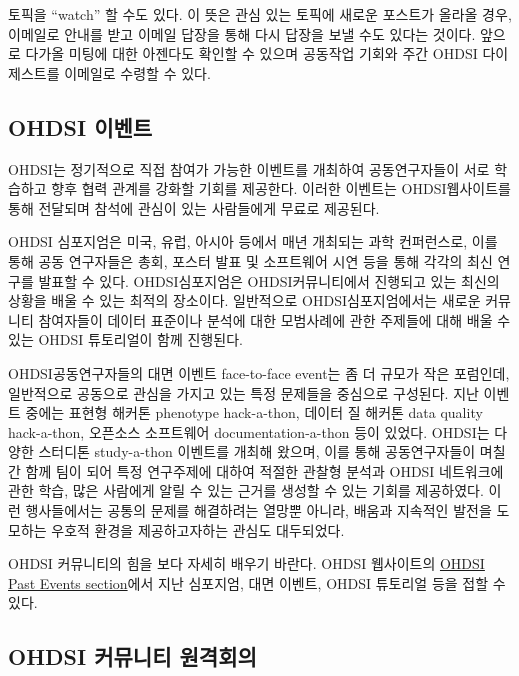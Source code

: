 \documentclass[11pt]{book}
\theoremstyle{definition}
\theoremstyle{definition}
\theoremstyle{definition}
\theoremstyle{remark}
\let\BeginKnitrBlock\begin \let\EndKnitrBlock\end
\begin{document}
\BeginKnitrBlock{rmdimportant}
토픽을 ``watch'' 할 수도 있다. 이 뜻은 관심 있는 토픽에 새로운 포스트가
올라올 경우, 이메일로 안내를 받고 이메일 답장을 통해 다시 답장을 보낼
수도 있다는 것이다. 앞으로 다가올 미팅에 대한 아젠다도 확인할 수 있으며
공동작업 기회와 주간 OHDSI 다이제스트를 이메일로 수령할 수 있다.
\EndKnitrBlock{rmdimportant}

\hypertarget{ohdsi-}{\subsection{OHDSI 이벤트}\label{ohdsi-}}

OHDSI는 정기적으로 직접 참여가 가능한 이벤트를 개최하여 공동연구자들이
서로 학습하고 향후 협력 관계를 강화할 기회를 제공한다. 이러한 이벤트는
OHDSI웹사이트를 통해 전달되며 참석에 관심이 있는 사람들에게 무료로
제공된다.

OHDSI 심포지엄은 미국, 유럽, 아시아 등에서 매년 개최되는 과학
컨퍼런스로, 이를 통해 공동 연구자들은 총회, 포스터 발표 및 소프트웨어
시연 등을 통해 각각의 최신 연구를 발표할 수 있다. OHDSI심포지엄은
OHDSI커뮤니티에서 진행되고 있는 최신의 상황을 배울 수 있는 최적의
장소이다. 일반적으로 OHDSI심포지엄에서는 새로운 커뮤니티 참여자들이
데이터 표준이나 분석에 대한 모범사례에 관한 주제들에 대해 배울 수 있는
OHDSI 튜토리얼이 함께 진행된다.

OHDSI공동연구자들의 대면 이벤트 face-to-face event는 좀 더 규모가 작은
포럼인데, 일반적으로 공동으로 관심을 가지고 있는 특정 문제들을 중심으로
구성된다. 지난 이벤트 중에는 표현형 해커톤 phenotype hack-a-thon, 데이터
질 해커톤 data quality hack-a-thon, 오픈소스 소프트웨어
documentation-a-thon 등이 있었다. OHDSI는 다양한 스터디톤 study-a-thon
이벤트를 개최해 왔으며, 이를 통해 공동연구자들이 며칠간 함께 팀이 되어
특정 연구주제에 대하여 적절한 관찰형 분석과 OHDSI 네트워크에 관한 학습,
많은 사람에게 알릴 수 있는 근거를 생성할 수 있는 기회를 제공하였다. 이런
행사들에서는 공통의 문제를 해결하려는 열망뿐 아니라, 배움과 지속적인
발전을 도모하는 우호적 환경을 제공하고자하는 관심도 대두되었다.

OHDSI 커뮤니티의 힘을 보다 자세히 배우기 바란다. OHDSI 웹사이트의
\href{https://www.ohdsi.org/past-events/}{OHDSI Past Events section}에서
지난 심포지엄, 대면 이벤트, OHDSI 튜토리얼 등을 접할 수 있다.

\subsection{OHDSI 커뮤니티 원격회의}\label{ohdsi--}
\end{document}
